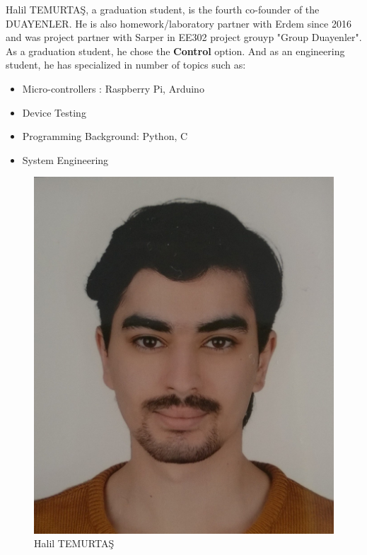 \documentclass[a4paper,12pt]{article}
\begin{document}
\begin{minipage}{0.61\textwidth}
\begin{flushleft} 

	Halil TEMURTAŞ, a graduation student, is the fourth co-founder of the DUAYENLER. He is also homework/laboratory partner with Erdem since 2016 and was project partner with Sarper in EE302 project grouyp "Group Duayenler". As a graduation student, he chose the \textbf{Control} option. And as an engineering student, he has specialized in number of topics such as:
	
	
\begin{itemize}
	\item Micro-controllers : Raspberry Pi, Arduino
	\item Device Testing 
	\item Programming Background: Python, C 
	\item System Engineering
\end{itemize}

\end{flushleft}
\end{minipage}
\begin{minipage}{0.38\textwidth}
\begin{flushright}
 
\begin{figure}[H]
	\center
	\setlength{\unitlength}{\textwidth} 
	\includegraphics[width=0.7\unitlength]{images/halil_foto}
	\caption{\label{fig:halil_foto} \small Halil TEMURTAŞ }
\end{figure}

\end{flushright}
\end{minipage}\\[0.4cm]
\end{document}
